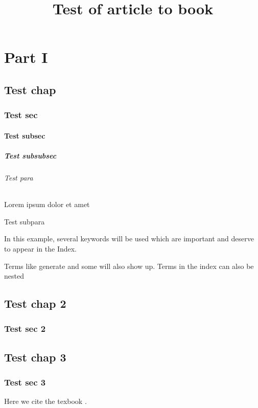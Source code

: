 \documentclass[titlepage]{article}
\title{Test of article to book}
\begin{document}
    \frontmatter
    \maketitle
    \tableofcontents
    \listoffigures
    \listoftables
    
    \part{Part I}
    \chapter{Test chap}
    \section{Test sec}
    \subsection{Test subsec}
    \subsubsection{Test subsubsec}
    \paragraph{Test para} Lorem ipsum dolor et amet
    \subparagraph{Test subpara}
    In this example, several keywords will be used 
    which are important and deserve to appear in the Index.
    
    Terms like generate and some will also 
    show up. Terms in the index can also be nested 
    
    \chapter{Test chap 2}
    \section{Test sec 2}

    \mainmatter
    \chapter{Test chap 3}
    \section{Test sec 3}
    Here we cite the texbook \cite{texbook}.
    
\end{document}
